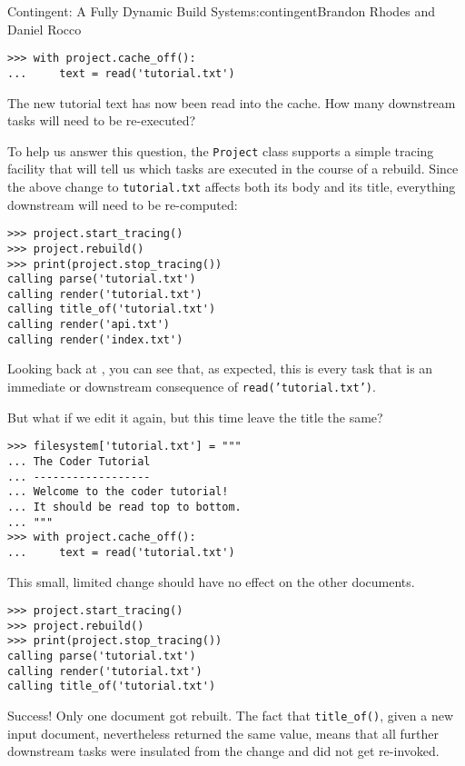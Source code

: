 \begin{aosachapter}{Contingent: A Fully Dynamic Build System}{s:contingent}{Brandon Rhodes and Daniel Rocco}
\begin{verbatim}
>>> with project.cache_off():
...     text = read('tutorial.txt')
\end{verbatim}

The new tutorial text has now been read into the cache. How many
downstream tasks will need to be re-executed?

To help us answer this question, the \texttt{Project} class supports a
simple tracing facility that will tell us which tasks are executed in
the course of a rebuild. Since the above change to \texttt{tutorial.txt}
affects both its body and its title, everything downstream will need to
be re-computed:

\begin{verbatim}
>>> project.start_tracing()
>>> project.rebuild()
>>> print(project.stop_tracing())
calling parse('tutorial.txt')
calling render('tutorial.txt')
calling title_of('tutorial.txt')
calling render('api.txt')
calling render('index.txt')
\end{verbatim}

Looking back at , you can see that,
as expected, this is every task that is an immediate or downstream
consequence of \texttt{read('tutorial.txt')}.

But what if we edit it again, but this time leave the title the same?

\begin{verbatim}
>>> filesystem['tutorial.txt'] = """
... The Coder Tutorial
... ------------------
... Welcome to the coder tutorial!
... It should be read top to bottom.
... """
>>> with project.cache_off():
...     text = read('tutorial.txt')
\end{verbatim}

This small, limited change should have no effect on the other documents.

\begin{verbatim}
>>> project.start_tracing()
>>> project.rebuild()
>>> print(project.stop_tracing())
calling parse('tutorial.txt')
calling render('tutorial.txt')
calling title_of('tutorial.txt')
\end{verbatim}

Success! Only one document got rebuilt. The fact that
\texttt{title\_of()}, given a new input document, nevertheless returned
the same value, means that all further downstream tasks were insulated
from the change and did not get re-invoked.

\label{conclusion}


\end{aosachapter}
